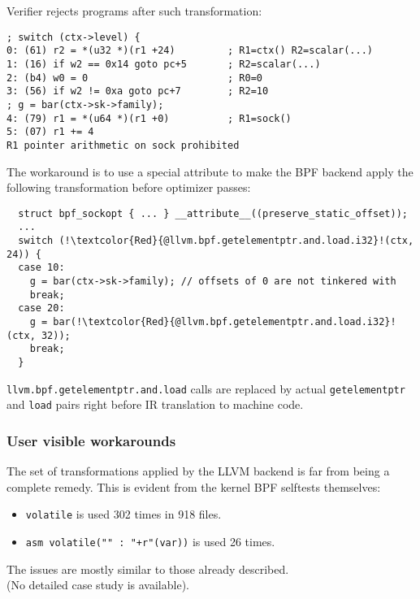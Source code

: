 \documentclass{beamer}
\newcommand{\code}[1]{\texttt{#1}}
\begin{document}
\begin{frame}
  \framebreak

  Verifier rejects programs after such transformation:

  \begin{verbatim}
; switch (ctx->level) {
0: (61) r2 = *(u32 *)(r1 +24)         ; R1=ctx() R2=scalar(...)
1: (16) if w2 == 0x14 goto pc+5       ; R2=scalar(...)
2: (b4) w0 = 0                        ; R0=0
3: (56) if w2 != 0xa goto pc+7        ; R2=10
; g = bar(ctx->sk->family);
4: (79) r1 = *(u64 *)(r1 +0)          ; R1=sock()
5: (07) r1 += 4
R1 pointer arithmetic on sock prohibited
  \end{verbatim}

  \framebreak

  The workaround is to use a special attribute to make the BPF backend
  apply the following transformation before optimizer passes:

  \begin{verbatim}
  struct bpf_sockopt { ... } __attribute__((preserve_static_offset));
  ...
  switch (!\textcolor{Red}{@llvm.bpf.getelementptr.and.load.i32}!(ctx, 24)) {
  case 10:
    g = bar(ctx->sk->family); // offsets of 0 are not tinkered with
    break;
  case 20:
    g = bar(!\textcolor{Red}{@llvm.bpf.getelementptr.and.load.i32}!(ctx, 32));
    break;
  }
  \end{verbatim}

  \code{llvm.bpf.getelementptr.and.load} calls are replaced by actual
  \code{getelementptr} and \code{load} pairs right before IR
  translation to machine code.

\end{frame}

\begin{frame}
\frametitle{User visible workarounds}

The set of transformations applied by the LLVM backend is far from
being a complete remedy. This is evident from the kernel BPF selftests
themselves:

\begin{itemize}
\item \code{volatile} is used 302 times in 918 files.
\item \code{asm volatile("" : "+r"(var))} is used 26 times.
\end{itemize}

The issues are mostly similar to those already described. \\
(No detailed case study is available).

\end{frame}
\end{document}
